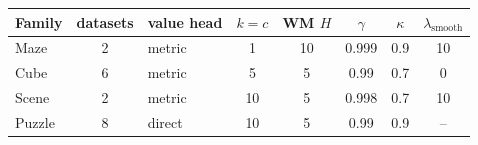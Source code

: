 \begin{tabular}{lclccccc}
\toprule
Family & datasets & value head & $k{=}c$ & WM $H$ & $\gamma$ & $\kappa$ & $\lambda_{\mathrm{smooth}}$ \\
\midrule
Maze & 2 & metric & 1 & 10 & 0.999 & 0.9 & 10 \\
Cube & 6 & metric & 5 & 5 & 0.99 & 0.7 & 0 \\
Scene & 2 & metric & 10 & 5 & 0.998 & 0.7 & 10 \\
Puzzle & 8 & direct & 10 & 5 & 0.99 & 0.9 & -- \\
\bottomrule
\end{tabular}
